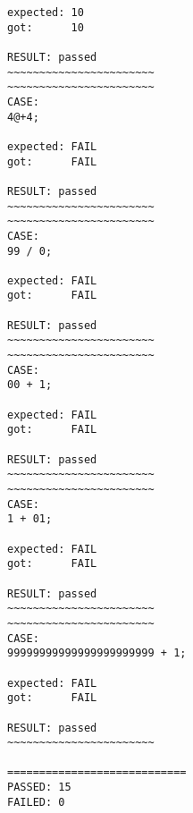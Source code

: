 \documentclass{article}
\begin{document}
\begin{verbatim}
expected: 10
got:      10

RESULT: passed
~~~~~~~~~~~~~~~~~~~~~~~
~~~~~~~~~~~~~~~~~~~~~~~
CASE: 
4@+4;

expected: FAIL
got:      FAIL

RESULT: passed
~~~~~~~~~~~~~~~~~~~~~~~
~~~~~~~~~~~~~~~~~~~~~~~
CASE: 
99 / 0;

expected: FAIL
got:      FAIL

RESULT: passed
~~~~~~~~~~~~~~~~~~~~~~~
~~~~~~~~~~~~~~~~~~~~~~~
CASE: 
00 + 1;

expected: FAIL
got:      FAIL

RESULT: passed
~~~~~~~~~~~~~~~~~~~~~~~
~~~~~~~~~~~~~~~~~~~~~~~
CASE: 
1 + 01;

expected: FAIL
got:      FAIL

RESULT: passed
~~~~~~~~~~~~~~~~~~~~~~~
~~~~~~~~~~~~~~~~~~~~~~~
CASE: 
99999999999999999999999 + 1;

expected: FAIL
got:      FAIL

RESULT: passed
~~~~~~~~~~~~~~~~~~~~~~~

============================
PASSED: 15
FAILED: 0
\end{verbatim}
\end{document}
